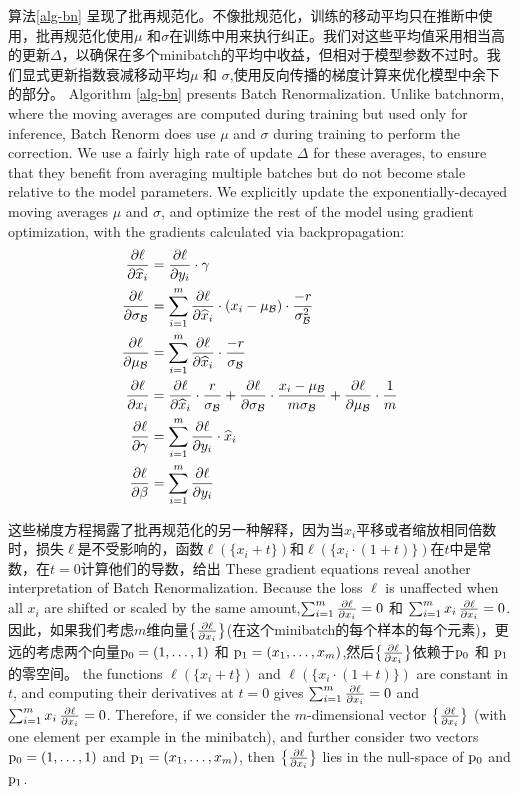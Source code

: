 算法\ref{alg-bn} 呈现了批再规范化。不像批规范化，训练的移动平均只在推断中使用，批再规范化使用$\mu$ 和$\sigma$在训练中用来执行纠正。我们对这些平均值采用相当高的更新$\Delta$，以确保在多个minibatch的平均中收益，但相对于模型参数不过时。我们显式更新指数衰减移动平均$\mu$ 和 $\sigma$,使用反向传播的梯度计算来优化模型中余下的部分。
Algorithm \ref{alg-bn} presents Batch Renormalization. Unlike batchnorm, where the moving averages are computed during training but used only for inference, Batch Renorm does use $\mu$ and $\sigma$ during training to perform the correction. We use a fairly high rate of update $\Delta$ for these averages, to ensure that they benefit from averaging multiple batches but do not become stale relative to the model parameters. We explicitly update the exponentially-decayed moving averages $\mu$ and $\sigma$, and optimize the rest of the model using gradient optimization, with the gradients calculated via backpropagation:
\begin{align*}
\frac{\partial \ell}{\partial \widehat{x}_i} &= \frac{\partial \ell}{\partial y_i}\cdot \gamma \\
\frac{\partial \ell}{\partial \sigma_{\mathcal{B}}}
&= \sum_{i=1}^m \frac{\partial \ell}{\partial \widehat{x}_i}\cdot(x_i-\mu_{\mathcal{B}})\cdot
\frac{-r}{\sigma_{\mathcal{B}}^2} \\
\frac{\partial \ell}{\partial \mu_{\mathcal{B}}} &=
\sum_{i=1}^m \frac{\partial \ell}{\partial \widehat{x}_i}\cdot
\frac{-r}{\sigma_{\mathcal{B}}}\\
   \frac{\partial \ell}{\partial x_i} &= \frac{\partial \ell}{\partial \widehat{x}_i} \cdot
\frac{r}{\sigma_{\mathcal{B}}} + \frac{\partial \ell}{\partial \sigma_{\mathcal{B}}}\cdot
\frac{x_i-\mu_{\mathcal{B}}}{m \sigma_{\mathcal{B}}} + \frac{\partial \ell}{\partial \mu_{\mathcal{B}}}\cdot \frac{1}{m}\\
\frac{\partial \ell}{\partial \gamma}&= \sum_{i=1}^m \frac{\partial \ell}{\partial y_i} \cdot \widehat{x}_i
  \\
  \frac{\partial \ell}{\partial \beta} &= \sum_{i=1}^m \frac{\partial \ell}{\partial y_i}
\end{align*}

这些梯度方程揭露了批再规范化的另一种解释，因为当$x_i$平移或者缩放相同倍数时，损失$\ell$是不受影响的，函数$\ell(\{x_i+t\})$和$\ell(\{x_i\cdot(1+t)\})$在$t$中是常数，在$t=0$计算他们的导数，给出
These gradient equations reveal another interpretation of Batch Renormalization. Because the loss $\ell$ is unaffected when all $x_i$ are shifted or scaled by the same amount,$\sum_{i=1}^m \frac{\partial \ell}{\partial x_i} = 0$ 和 $\sum_{i=1}^m x_i\,\frac{\partial \ell}{\partial x_i} = 0$.因此，如果我们考虑$m$维向量$\big\{\frac{\partial \ell}{\partial x_i}\big\}$(在这个minibatch的每个样本的每个元素)，更远的考虑两个向量$\mathrm{p}_0=(1,\ldots,1)$ 和 $\mathrm{p}_1=(x_1,\ldots,x_m)$,然后$\big\{\frac{\partial \ell}{\partial x_i}\big\}$依赖于$\mathrm{p}_0$ 和 $\mathrm{p}_1$的零空间。
the functions $\ell(\{x_i+t\})$ and $\ell(\{x_i\cdot(1+t)\})$ are constant in $t$, and computing their derivatives at $t=0$ gives $\sum_{i=1}^m \frac{\partial \ell}{\partial x_i} = 0$ and $\sum_{i=1}^m x_i\,\frac{\partial \ell}{\partial x_i} = 0$. Therefore, if we consider the $m$-dimensional vector $\big\{\frac{\partial \ell}{\partial x_i}\big\}$ (with one element per example in the minibatch), and further consider two vectors
$\mathrm{p}_0=(1,\ldots,1)$ and $\mathrm{p}_1=(x_1,\ldots,x_m)$, then $\big\{\frac{\partial \ell}{\partial x_i}\big\}$ lies in the null-space of $\mathrm{p}_0$ and $\mathrm{p}_1$.

